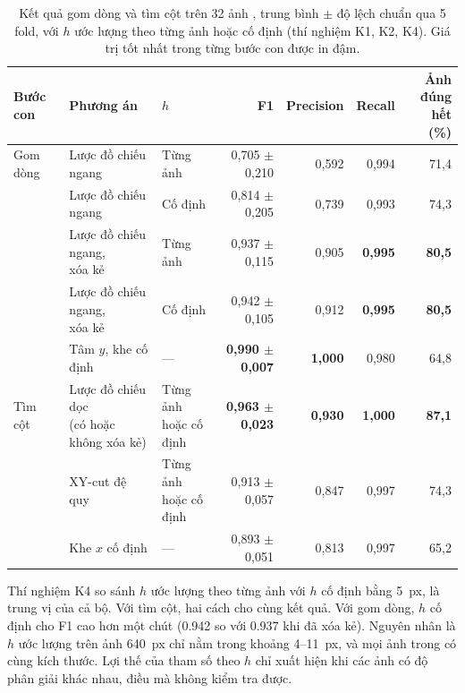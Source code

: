 \begin{table}[H]
\centering\small
\caption{Kết quả gom dòng và tìm cột trên 32 ảnh , trung bình $\pm$ độ lệch chuẩn qua 5 fold, với $h$ ước lượng theo từng ảnh hoặc cố định (thí nghiệm K1, K2, K4).
Giá trị tốt nhất trong từng bước con được in đậm.}\label{tab:K2full}
\begin{tabular}{lllrrrr}
\toprule
\textbf{Bước con} & \textbf{Phương án} & \textbf{$h$} & \textbf{F1} & \textbf{Precision} & \textbf{Recall} & \makecell[r]{\textbf{Ảnh đúng}\\\textbf{hết (\%)}} \\
\midrule
Gom dòng & Lược đồ chiếu ngang & Từng ảnh & 0,705 $\pm$ 0,210 & 0,592 & 0,994 & 71,4 \\
         & Lược đồ chiếu ngang & Cố định & 0,814 $\pm$ 0,205 & 0,739 & 0,993 & 74,3 \\
         & \makecell[l]{Lược đồ chiếu ngang,\\xóa kẻ} & Từng ảnh & 0,937 $\pm$ 0,115 & 0,905 & \textbf{0,995} & \textbf{80,5} \\
         & \makecell[l]{Lược đồ chiếu ngang,\\xóa kẻ} & Cố định & 0,942 $\pm$ 0,105 & 0,912 & \textbf{0,995} & \textbf{80,5} \\
         & Tâm $y$, khe cố định & --- & \textbf{0,990 $\pm$ 0,007} & \textbf{1,000} & 0,980 & 64,8 \\
\midrule
Tìm cột  & \makecell[l]{Lược đồ chiếu dọc\\(có hoặc không xóa kẻ)} & \makecell[l]{Từng ảnh\\hoặc cố định} & \textbf{0,963 $\pm$ 0,023} & \textbf{0,930} & \textbf{1,000} & \textbf{87,1} \\
         & XY-cut đệ quy & \makecell[l]{Từng ảnh\\hoặc cố định} & 0,913 $\pm$ 0,057 & 0,847 & 0,997 & 74,3 \\
         & Khe $x$ cố định & --- & 0,893 $\pm$ 0,051 & 0,813 & 0,997 & 65,2 \\
\bottomrule
\end{tabular}
\end{table}

Thí nghiệm K4 so sánh $h$ ước lượng theo từng ảnh với $h$ cố định bằng 5~px, là trung vị của cả bộ.
Với tìm cột, hai cách cho cùng kết quả.
Với gom dòng, $h$ cố định cho F1 cao hơn một chút (\num{0.942} so với \num{0.937} khi đã xóa kẻ).
Nguyên nhân là $h$ ước lượng trên ảnh 640~px chỉ nằm trong khoảng 4--11~px, và mọi ảnh trong  có cùng kích thước.
Lợi thế của tham số theo $h$ chỉ xuất hiện khi các ảnh có độ phân giải khác nhau, điều mà  không kiểm tra được.

